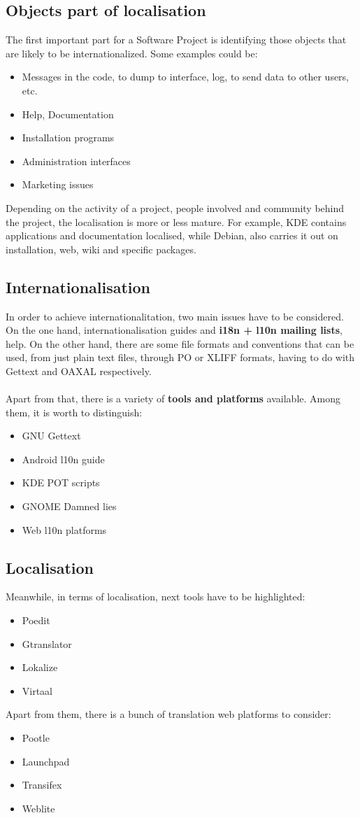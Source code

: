 \documentclass[11pt]{article}
\begin{document}
\subsection{Objects part of localisation}
The first important part for a Software Project is identifying those objects that are likely to be internationalized. Some examples could be:
\begin{itemize}
\item{Messages in the code, to dump to interface, log, to send data to other users, etc.}
\item{Help, Documentation}
\item{Installation programs}
\item{Administration interfaces}
\item{Marketing issues}
\end{itemize}
Depending on the activity of a project, people involved and community behind the project, the localisation is more or less mature. For example, KDE contains applications and documentation localised, while Debian, also carries it out on installation, web, wiki and specific packages.
\subsection{Internationalisation}
In order to achieve internationalitation, two main issues have to be considered.
On the one hand, internationalisation guides and \textbf{i18n + l10n mailing lists}, help. On the other hand, there are some file formats and conventions that can be used, from just plain text files, through PO or XLIFF formats, having to do with Gettext and OAXAL respectively.\\
\\
Apart from that, there is a variety of \textbf{tools and platforms} available. Among them, it is worth to distinguish:
\begin{itemize}
\item{GNU Gettext}
\item{Android l10n guide}
\item{KDE POT scripts}
\item{GNOME Damned lies}
\item{Web l10n platforms}
\end{itemize}
\subsection{Localisation}
Meanwhile, in terms of localisation, next tools have to be highlighted:
\begin{itemize}
\item{Poedit}
\item{Gtranslator}
\item{Lokalize}
\item{Virtaal}
\end{itemize}
Apart from them, there is a bunch of translation web platforms to consider:
\begin{itemize}
\item{Pootle}
\item{Launchpad}
\item{Transifex}
\item{Weblite}
\end{itemize}
\end{document}
